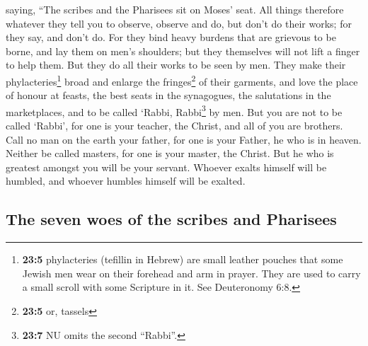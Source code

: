  saying, ``The scribes and the Pharisees sit on Moses'
seat.  All things therefore whatever they tell you to
observe, observe and do, but don't do their works; for they say, and
don't do.  For they bind heavy burdens that are grievous
to be borne, and lay them on men's shoulders; but they themselves will
not lift a finger to help them.  But they do all their
works to be seen by men. They make their phylacteries\footnote{\textbf{23:5}
  phylacteries (tefillin in Hebrew) are small leather pouches that some
  Jewish men wear on their forehead and arm in prayer. They are used to
  carry a small scroll with some Scripture in it. See Deuteronomy 6:8.}
broad and enlarge the fringes\footnote{\textbf{23:5} or, tassels} of
their garments,  and love the place of honour at feasts,
the best seats in the synagogues,  the salutations in the
marketplaces, and to be called `Rabbi, Rabbi\footnote{\textbf{23:7} NU
  omits the second ``Rabbi''.} by men.  But you are not to
be called `Rabbi', for one is your teacher, the Christ, and all of you
are brothers.  Call no man on the earth your father, for
one is your Father, he who is in heaven.  Neither be
called masters, for one is your master, the Christ.  But
he who is greatest amongst you will be your servant. 
Whoever exalts himself will be humbled, and whoever humbles himself will
be exalted.

\hypertarget{the-seven-woes-of-the-scribes-and-pharisees}{%
\subsection{The seven woes of the scribes and
Pharisees}\label{the-seven-woes-of-the-scribes-and-pharisees}}

